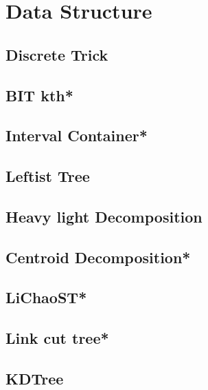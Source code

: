 \section{Data Structure}
\subsection{Discrete Trick}

\subsection{BIT kth*} %

\subsection{Interval Container*} %

\subsection{Leftist Tree}

\subsection{Heavy light Decomposition}

\subsection{Centroid Decomposition*} %

% 
\subsection{LiChaoST*} %

\subsection{Link cut tree*} %

\subsection{KDTree}

% 


